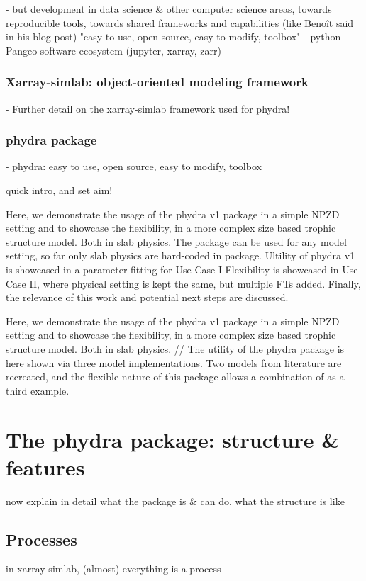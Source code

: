 \documentclass[journal abbreviations, manuscript]{copernicus}
\begin{document}
- but development in data science & other computer science areas, towards reproducible tools, towards shared frameworks and capabilities (like Benoît said in his blog post)
"easy to use, open source, easy to modify, toolbox"
- python Pangeo software ecosystem (jupyter, xarray, zarr)

\subsubsection{Xarray-simlab: object-oriented modeling framework}
- Further detail on the xarray-simlab framework used for phydra!

\subsubsection{phydra package}
- phydra: easy to use, open source, easy to modify, toolbox

quick intro, and set aim!

Here, we demonstrate the usage of the phydra v1 package in a simple NPZD setting and to showcase the flexibility, in a more complex size based trophic structure model. Both in slab physics.
The package can be used for any model setting, so far only slab physics are hard-coded in package.
Ultility of phydra v1 is showcased in a parameter fitting for Use Case I
Flexibility is showcased in Use Case II, where physical setting is kept the same, but multiple FTs added.
Finally, the relevance of this work and potential next steps are discussed.

Here, we demonstrate the usage of the phydra v1 package in a simple NPZD setting and to showcase the flexibility, in a more complex size based trophic structure model. Both in slab physics.
//
The utility of the phydra package is here shown via three model implementations. Two models from literature are recreated, and the flexible nature of this package allows a combination of as a third example. 








\section{The phydra package: structure \& features}

now explain in detail what the package is \& can do, what the structure is like

\subsection{Processes}
in xarray-simlab, (almost) everything is a process
\end{document}

